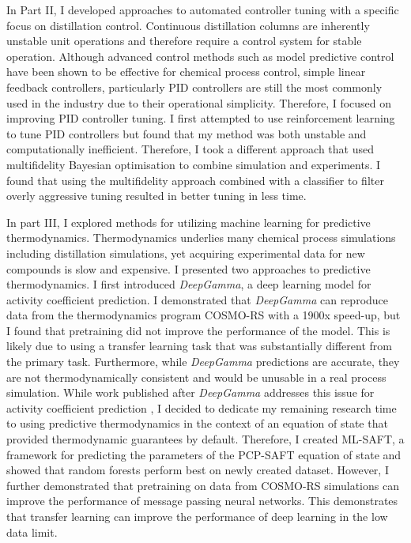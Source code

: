 In Part II, I developed approaches to automated controller tuning with a specific focus on distillation control. Continuous distillation columns are inherently unstable unit operations and therefore require a control system for stable operation. Although advanced control methods such as model predictive control have been shown to be effective for chemical process control, simple linear feedback controllers, particularly PID controllers are still the most commonly used in the industry due to their operational simplicity. Therefore, I focused on improving PID controller tuning. I first attempted to use reinforcement learning to tune PID controllers but found that my method was both unstable and computationally inefficient. Therefore, I took a different approach that used multifidelity Bayesian optimisation to combine simulation and experiments.  I found that using the multifidelity approach combined with a classifier to filter overly aggressive tuning resulted in better tuning in less time.


In part III, I explored methods for utilizing machine learning for predictive thermodynamics. Thermodynamics underlies many chemical process simulations including distillation simulations, yet acquiring experimental  data for new compounds is slow and expensive. I presented two approaches to predictive thermodynamics.  I first introduced \textit{DeepGamma}, a deep learning model for activity coefficient prediction. I demonstrated that \textit{DeepGamma} can reproduce data from the thermodynamics program COSMO-RS with a 1900x speed-up, but I found that pretraining  did not improve the performance of the model. This is likely due to using a transfer learning task that was substantially different from the primary task. Furthermore, while \textit{DeepGamma} predictions are accurate, they are not thermodynamically consistent and would be unusable in a real process simulation. While work published after \textit{DeepGamma} addresses this issue for activity coefficient prediction \cite{Winter2022, SanchezMedina2023}, I decided to dedicate my remaining research time to using predictive thermodynamics in the context of an equation of state that provided thermodynamic guarantees by default. Therefore, I created ML-SAFT, a framework for predicting the parameters of the PCP-SAFT equation of state and showed that random forests perform best on newly created dataset. However, I further demonstrated that pretraining on data from COSMO-RS simulations can improve the performance of message passing neural networks. This demonstrates that transfer learning can improve the performance of deep learning in the low data limit.

